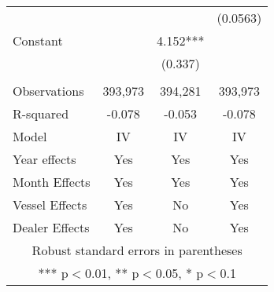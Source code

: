 \begin{tabular}{lccc}
 &  &  & (0.0563) \\
Constant &  & 4.152*** &  \\
 &  & (0.337) &  \\
 &  &  &  \\
Observations & 393,973 & 394,281 & 393,973 \\
R-squared & -0.078 & -0.053 & -0.078 \\
Model & IV & IV & IV \\
Year effects & Yes & Yes & Yes \\
Month Effects & Yes & Yes & Yes \\
Vessel Effects & Yes & No & Yes \\
 Dealer Effects & Yes & No & Yes \\ \hline
\multicolumn{4}{c}{ Robust standard errors in parentheses} \\
\multicolumn{4}{c}{ *** p$<$0.01, ** p$<$0.05, * p$<$0.1} \\
\end{tabular}
